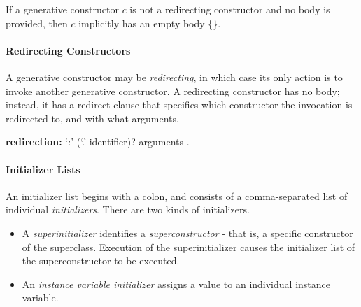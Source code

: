 \documentclass{article}
\newcommand{\code}[1]{{\sf #1}}
\begin{document}

\LMHash{}
If a generative constructor $c$  is not a redirecting constructor and no body is provided, then $c$ implicitly has an empty body \code{\{\}}.


\paragraph{Redirecting Constructors}

\LMHash{}
A generative constructor may be {\em redirecting}, in which case its only action is to invoke another generative constructor.  A redirecting constructor has no body; instead, it has a redirect clause that specifies which constructor the invocation is redirected to, and with what arguments.

\begin{grammar}
{\bf redirection:}
     `{\escapegrammar :}' \THIS{} (`{\escapegrammar .}' identifier)? arguments
    .
\end{grammar}




\paragraph{Initializer Lists}

\LMHash{}
An initializer list begins with a colon, and consists of a comma-separated list of individual {\em initializers}. There are two kinds of initializers.
\begin{itemize}
\item A {\em superinitializer} identifies a {\em superconstructor} - that is, a specific  constructor of the superclass.  Execution of the superinitializer causes the initializer list of the superconstructor to be executed.

\item An {\em instance variable initializer} assigns a value to an individual instance variable. 
\end{itemize}
\end{document}
